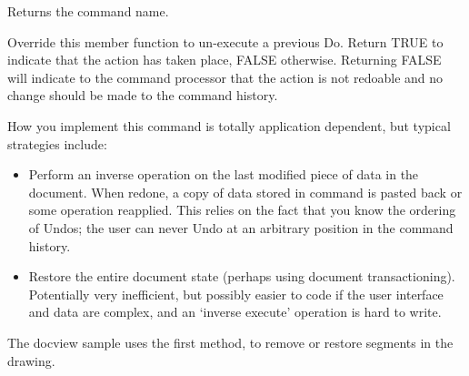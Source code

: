 

Returns the command name.



Override this member function to un-execute a previous Do.
Return TRUE to indicate that the action has taken place, FALSE otherwise.
Returning FALSE will indicate to the command processor that the action is
not redoable and no change should be made to the command history.

How you implement this command is totally application dependent, but typical
strategies include:

\begin{itemize}\itemsep=0pt
\item Perform an inverse operation on the last modified piece of
data in the document. When redone, a copy of data stored in command
is pasted back or some operation reapplied. This relies on the fact that
you know the ordering of Undos; the user can never Undo at an arbitrary position
in the command history.
\item Restore the entire document state (perhaps using document transactioning).
Potentially very inefficient, but possibly easier to code if the user interface
and data are complex, and an `inverse execute' operation is hard to write.
\end{itemize}

The docview sample uses the first method, to remove or restore segments
in the drawing.


